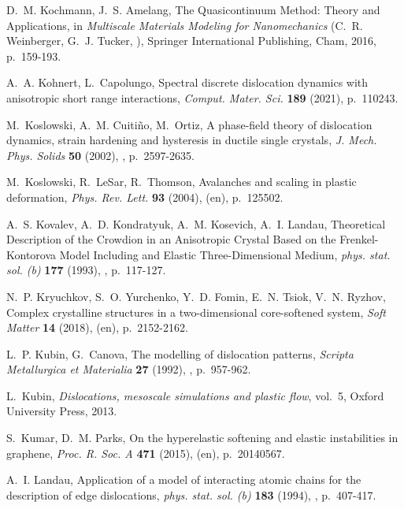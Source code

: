 \documentclass[CRPHYS,Unicode,manuscript]{cedram}
\begin{document}
\begin{thebibliography}{100}
D.~M. Kochmann, J.~S. Amelang, {\og The Quasicontinuum Method: Theory and
  Applications\fg}, in \emph{Multiscale Materials Modeling for Nanomechanics}
  (C.~R. Weinberger, G.~J. Tucker, \cdredsname), Springer International
  Publishing, Cham, 2016, p.~159-193.

A.~A. Kohnert, L.~Capolungo, {\og Spectral discrete dislocation dynamics with
  anisotropic short range interactions\fg}, \emph{Comput. Mater. Sci.}
  \textbf{189} (2021), p.~110243.

M.~Koslowski, A.~M. Cuiti{\~n}o, M.~Ortiz, {\og A phase-field theory of
  dislocation dynamics, strain hardening and hysteresis in ductile single
  crystals\fg}, \emph{J. Mech. Phys. Solids} \textbf{50} (2002), ,
  p.~2597-2635.

M.~Koslowski, R.~LeSar, R.~Thomson, {\og Avalanches and scaling in plastic
  deformation\fg}, \emph{Phys. Rev. Lett.} \textbf{93} (2004), 
  (en), p.~125502.

A.~S. Kovalev, A.~D. Kondratyuk, A.~M. Kosevich, A.~I. Landau, {\og Theoretical
  Description of the Crowdion in an Anisotropic Crystal Based on the
  {Frenkel-Kontorova} Model Including and Elastic {Three-Dimensional}
  Medium\fg}, \emph{phys. stat. sol. (b)} \textbf{177} (1993), ,
  p.~117-127.

N.~P. Kryuchkov, S.~O. Yurchenko, Y.~D. Fomin, E.~N. Tsiok, V.~N. Ryzhov, {\og
  Complex crystalline structures in a two-dimensional core-softened system\fg},
  \emph{Soft Matter} \textbf{14} (2018),  (en), p.~2152-2162.

L.~P. Kubin, G.~Canova, {\og The modelling of dislocation patterns\fg},
  \emph{Scripta Metallurgica et Materialia} \textbf{27} (1992), ,
  p.~957-962.

L.~Kubin, \emph{Dislocations, mesoscale simulations and plastic flow}, vol.~5,
  Oxford University Press, 2013.

S.~Kumar, D.~M. Parks, {\og On the hyperelastic softening and elastic
  instabilities in graphene\fg}, \emph{Proc. R. Soc. A} \textbf{471} (2015),
   (en), p.~20140567.

A.~I. Landau, {\og Application of a model of interacting atomic chains for the
  description of edge dislocations\fg}, \emph{phys. stat. sol. (b)}
  \textbf{183} (1994), , p.~407-417.


\end{thebibliography}
\end{document}
